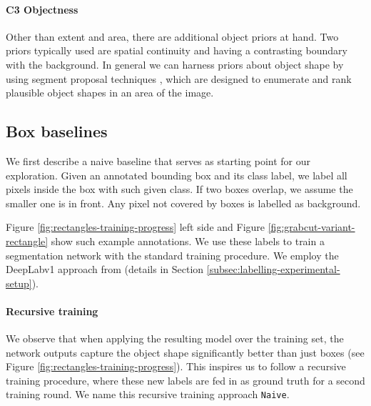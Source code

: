 \documentclass[10pt,english,british,twocolumn]{article}
\begin{document}
\paragraph{C3 Objectness}

Other than extent and area, there are additional object priors at
hand. Two priors typically used are spatial continuity and having
a contrasting boundary with the background. In general we can harness
priors about object shape by using segment proposal techniques \cite{PontTuset2015Iccv},
which are designed to enumerate and rank plausible object shapes in
an area of the image.

\subsection{\label{subsec:Box-baselines}Box baselines}

We first describe a naive baseline that serves as starting point for
our exploration. Given an annotated bounding box and its class label,
we label all pixels inside the box with such given class. If two boxes
overlap, we assume the smaller one is in front. Any pixel not covered
by boxes is labelled as background.

Figure \ref{fig:rectangles-training-progress} left side and Figure
\ref{fig:grabcut-variant-rectangle} show such example annotations.
We use these labels to train a segmentation network with the standard
training procedure. We employ the Deep\-Lab\-v1 approach from \cite{Chen2015Iclr}
(details in Section \ref{subsec:labelling-experimental-setup}). 

\paragraph{Recursive training}

We observe that when applying the resulting model over the training
set, the network outputs capture the object shape significantly better
than just boxes (see Figure \ref{fig:rectangles-training-progress}).
This inspires us to follow a recursive training procedure, where these
new labels are fed in as ground truth for a second training round.
We name this recursive training approach \texttt{Naive}. 
\end{document}
